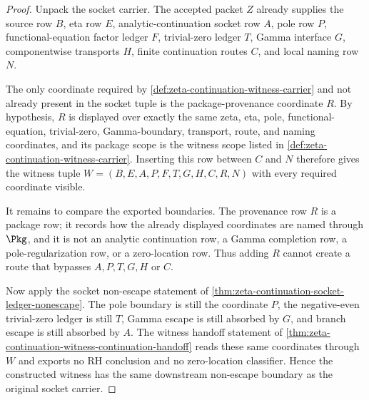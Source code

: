 \begin{proof}
Unpack the socket carrier. The accepted packet $Z$ already supplies the source row $B$, eta row $E$, analytic-continuation socket row $A$, pole row $P$, functional-equation factor ledger $F$, trivial-zero ledger $T$, Gamma interface $G$, componentwise transports $H$, finite continuation routes $C$, and local naming row $N$.

The only coordinate required by \autoref{def:zeta-continuation-witness-carrier} and not already present in the socket tuple is the package-provenance coordinate $R$. By hypothesis, $R$ is displayed over exactly the same zeta, eta, pole, functional-equation, trivial-zero, Gamma-boundary, transport, route, and naming coordinates, and its package scope is the witness scope listed in \autoref{def:zeta-continuation-witness-carrier}. Inserting this row between $C$ and $N$ therefore gives the witness tuple $W=(B,E,A,P,F,T,G,H,C,R,N)$ with every required coordinate visible.

It remains to compare the exported boundaries. The provenance row $R$ is a package row; it records how the already displayed coordinates are named through $\Pkg$, and it is not an analytic continuation row, a Gamma completion row, a pole-regularization row, or a zero-location row. Thus adding $R$ cannot create a route that bypasses $A,P,T,G,H$ or $C$.

Now apply the socket non-escape statement of \autoref{thm:zeta-continuation-socket-ledger-nonescape}. The pole boundary is still the coordinate $P$, the negative-even trivial-zero ledger is still $T$, Gamma escape is still absorbed by $G$, and branch escape is still absorbed by $A$. The witness handoff statement of \autoref{thm:zeta-continuation-witness-continuation-handoff} reads these same coordinates through $W$ and exports no RH conclusion and no zero-location classifier. Hence the constructed witness has the same downstream non-escape boundary as the original socket carrier.
\end{proof}

